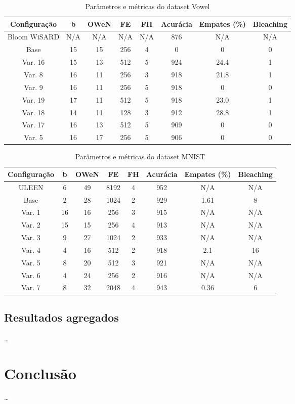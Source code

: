 \documentclass{article}
\begin{document}
{\begin{table}[h!]
\caption{Parâmetros e métricas do dataset Vowel}
\begin{tabular}{|c|c|c|c|c|c|c|c|}
\hline
\textbf{Configuração} & \textbf{b} & \textbf{OWeN} & \textbf{FE} & \textbf{FH} & \textbf{Acurácia} & \textbf{Empates (\%)} & \textbf{Bleaching} \\
\hline
Bloom WiSARD & N/A & N/A & N/A & N/A & 876 & N/A & N/A \\
\hline
Base & 15 & 15 & 256 & 4 & 0 & 0 & 0 \\
\hline
Var. 16 & 15 & 13 & 512 & 5 & 924 & 24.4 & 1 \\
\hline
Var. 8 & 16 & 11 & 256 & 3 & 918 & 21.8 & 1 \\
\hline
Var. 9 & 16 & 11 & 256 & 5 & 918 & 0 & 0 \\
\hline
Var. 19 & 17 & 11 & 512 & 5 & 918 & 23.0 & 1 \\
\hline
Var. 18 & 14 & 11 & 128 & 3 & 912 & 28.8 & 1 \\
\hline
Var. 17 & 16 & 13 & 512 & 5 & 909 & 0 & 0 \\
\hline
Var. 5 & 16 & 17 & 256 & 5 & 906 & 0 & 0 \\
\hline
\end{tabular}
\end{table}

\begin{table}[h!]
\caption{Parâmetros e métricas do dataset MNIST}
\begin{tabular}{|c|c|c|c|c|c|c|c|}
\hline
\textbf{Configuração} & \textbf{b} & \textbf{OWeN} & \textbf{FE} & \textbf{FH} & \textbf{Acurácia} & \textbf{Empates (\%)} & \textbf{Bleaching} \\
\hline
ULEEN & 6 & 49 & 8192 & 4 & 952 & N/A & N/A \\
\hline
Base & 2 & 28 & 1024 & 2 & 929 & 1.61 & 8 \\
\hline
Var. 1 & 16 & 16 & 256 & 3 & 915 & N/A & N/A \\
\hline
Var. 2 & 15 & 15 & 256 & 4 & 913 & N/A & N/A \\
\hline
Var. 3 & 9 & 27 & 1024 & 2 & 933 & N/A & N/A \\
\hline
Var. 4 & 4 & 16 & 512 & 2 & 918 & 2.1 & 16 \\
\hline
Var. 5 & 8 & 20 & 512 & 3 & 921 & N/A & N/A \\
\hline
Var. 6 & 4 & 24 & 256 & 2 & 916 & N/A & N/A \\
\hline
Var. 7 & 8 & 32 & 2048 & 4 & 943 & 0.36 & 6 \\
\hline
\end{tabular}
\end{table}
}

\subsection{Resultados agregados}

\ldots

\section{Conclusão}

\ldots



\end{document}
